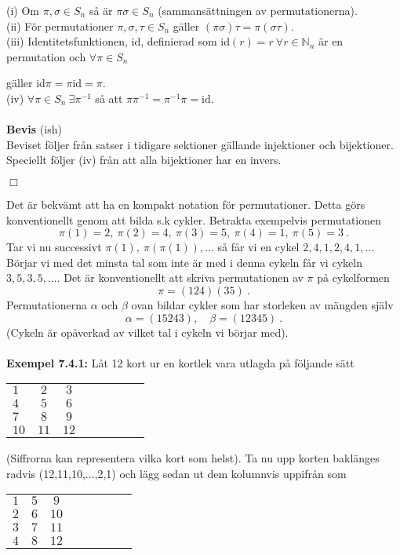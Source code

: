 \documentclass{article}
\begin{document}
(i) Om $\pi,\sigma\in S_n$ så är $\pi\sigma\in S_n$ (sammansättningen av permutationerna).\\ 

(ii) För permutationer $\pi,\sigma,\tau\in S_n$ gäller $(\pi\sigma)\tau=\pi(\sigma\tau)$.\\ 

(iii) Identitetsfunktionen, id, definierad som id$(r)=r \ \forall r\in\mathbb{N}_n$ är en permutation och $\forall\pi\in S_n$ 

gäller id$\pi=\pi$id$=\pi$.\\ 

(iv) $\forall\pi\in S_n \ \exists \pi^{-1}$ så att $\pi\pi^{-1}=\pi^{-1}\pi=$id.\\ \\
\textbf{Bevis} (ish)\\ 
Beviset följer från satser i tidigare sektioner gällande injektioner och bijektioner. Speciellt följer (iv) från att alla bijektioner har en invers.
\begin{flushright}
$\Box$
\end{flushright}
Det är bekvämt att ha en kompakt notation för permutationer. Detta görs konventionellt genom att bilda s.k cykler. Betrakta exempelvis permutationen
$$
\pi(1)=2, \ \pi(2)=4, \ \pi(3)=5, \ \pi(4)=1, \ \pi(5)=3 \ .
$$
Tar vi nu successivt $\pi(1), \ \pi(\pi(1)),...$ så får vi en cykel $2,4,1,2,4,1,...$ Börjar vi med det minsta tal som inte är med i denna cykeln får vi cykeln $3,5,3,5,...$. Det är konventionellt att skriva permutationen av $\pi$ på cykelformen
$$
\pi=(124)(35) \ .
$$
Permutationerna $\alpha$ och $\beta$ ovan bildar cykler som har storleken av mängden själv
$$
\alpha=(15243), \quad \beta=(12345) \ .
$$
(Cykeln är opåverkad av vilket tal i cykeln vi börjar med).\\ \\ 
\textbf{Exempel 7.4.1:} Låt 12 kort ur en kortlek vara utlagda på följande sätt
\begin{center}
\begin{tabular}{l*{6}{c}r}
$1$ & $2$ & $3$\\
$4$ & $5$ & $6$\\
$7$ & $8$ & $9$\\
$10$ & $11$ & $12$
\end{tabular}
\end{center}
(Siffrorna kan representera vilka kort som helst). Ta nu upp korten baklänges radvis (12,11,10,...,2,1) och lägg sedan ut dem kolumnvis uppifrån som
\begin{center}
\begin{tabular}{l*{6}{c}r}
$1$ & $5$ & $9$\\
$2$ & $6$ & $10$\\
$3$ & $7$ & $11$\\
$4$ & $8$ & $12$
\end{tabular}
\end{center}
\end{document}
